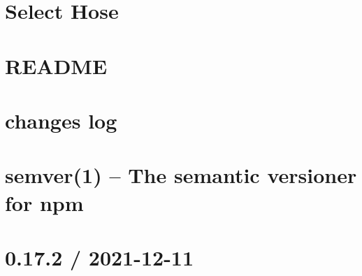 \documentclass[twoside]{book}
\newcommand{\+}{\discretionary{\mbox{\scriptsize$\hookleftarrow$}}{}{}}
\begin{document}
\chapter{Select Hose}
\label{md__c___users_vaishnavi_jadhav__desktop__developer_code_mean_stack_example_client_node_modules_select_hose__r_e_a_d_m_e}

\chapter{README}
\label{md__c___users_vaishnavi_jadhav__desktop__developer_code_mean_stack_example_client_node_modules_selfsigned__r_e_a_d_m_e}

\chapter{changes log}
\label{md__c___users_vaishnavi_jadhav__desktop__developer_code_mean_stack_example_client_node_modules_semver__c_h_a_n_g_e_l_o_g}

\chapter{semver(1) -- The semantic versioner for npm}
\label{md__c___users_vaishnavi_jadhav__desktop__developer_code_mean_stack_example_client_node_modules_semver__r_e_a_d_m_e}

\chapter{0.17.2 / 2021-\/12-\/11}
\label{md__c___users_vaishnavi_jadhav__desktop__developer_code_mean_stack_example_client_node_modules_send__h_i_s_t_o_r_y}

\end{document}
